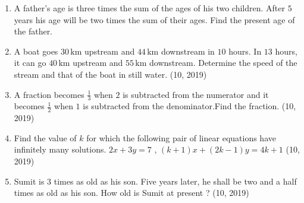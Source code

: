 \begin{enumerate}[label=\thesubsection.\arabic*, ref=\thesubsection.\theenumi]
\item A father's age is three times the sum of the ages of his two children. After $5$ years his age will be two times the sum of their ages. Find the present age of the father.
\item A boat goes $30 \,\text{km}$ upstream and $44 \,\text{km}$ downstream in $10$ hours. In $13$ hours, it can go $40\,\text{km}$ upstream and $55 \,\text{km}$ downstream. Determine the speed of the stream and that of the boat in still water.
\hfill (10, 2019)

\item A fraction becomes $\frac{1}{3}$ when $2$ is subtracted from the numerator and it becomes $\frac{1}{2}$ when $1$ is subtracted from the denominator.Find the fraction.
\hfill (10, 2019)

\item Find the value of $k$ for which the following pair of linear equations have infinitely many solutions. $2x+3y=7$ , $(k+1)x+(2k-1)y=4k+1$
\hfill (10, 2019)
\item Sumit is $3$ times as old as his son. Five years later, he shall be two and a half times as old as his son. How old is Sumit at present ?
\hfill (10, 2019)

\end{enumerate}
